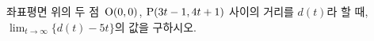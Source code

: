좌표평면 위의 두 점~$\mathrm{O}(0{,}\mkern3mu\mathopen{}0)$, $\mathrm{P}(3t-1{,}\mkern3mu\mathopen{}4t+1)$ 사이의 거리를 $d(t)$라 할 때, $\displaystyle\lim_{t\to\infty}\{d(t)-5t\}$의 값을 구하시오.

